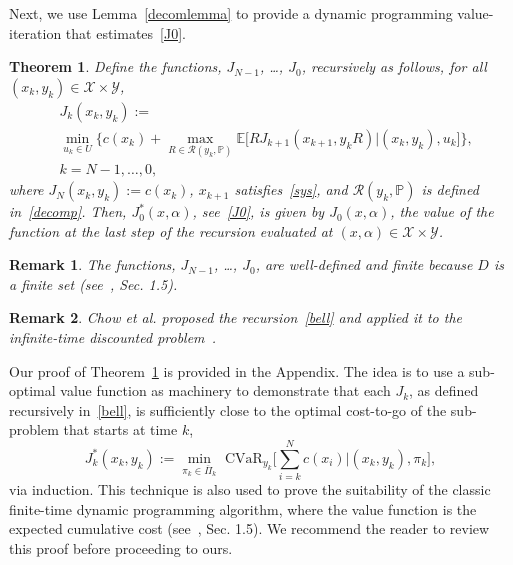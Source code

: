 \documentclass[letterpaper, 10 pt, conference]{ieeeconf}  %
\newtheorem{theorem}{Theorem}
\newtheorem{remark}{Remark}
\begin{document}
Next, we use Lemma~\ref{decomlemma} to provide a dynamic programming value-iteration that estimates~\eqref{J0}.
\begin{theorem}\label{thm}
Define the functions, $J_{N-1}$, \dots, $J_0$, recursively as follows, for all $(x_k, y_k) \in \mathcal{X} \times \mathcal{Y}$,
\begin{equation}\begin{aligned}
& J_k(x_k,y_k) := \\
& {\underset{u_k \in U}\min} \Bigg\{ c(x_k) + {\underset{R \in \mathcal{R}(y_k, \mathbb{P})}\max} \mathbb{E}\Big[ R J_{k+1}(x_{k+1}, y_k R) \Big| (x_k, y_k), u_k \Big] \Bigg\}, \\
& k = N-1, \dots, 0,
\end{aligned}\label{bell}\end{equation}
where $J_N(x_k, y_k) := c(x_k)$, $x_{k+1}$ satisfies~\eqref{sys}, and $\mathcal{R}(y_k, \mathbb{P})$ is defined in~\eqref{decomp}.  
Then, $J_0^*(x,\alpha)$, see~\eqref{J0}, is given by $J_0(x, \alpha)$, 
the value of the function at the last step of the recursion evaluated at $(x,\alpha) \in \mathcal{X} \times \mathcal{Y}$.
\end{theorem}
\begin{remark}
The functions, $J_{N-1}$, \dots, $J_0$, are well-defined and finite because $D$ is a finite set (see~\cite{bertsekas2005dynamic}, Sec. 1.5).
\end{remark}
\begin{remark}
Chow et al. proposed the recursion~\eqref{bell} and applied it to the infinite-time discounted problem~\cite{chow2015risk}. 
\end{remark}

Our proof of Theorem~\ref{thm} is provided in the Appendix.
The idea is to use a sub-optimal value function as machinery to demonstrate that each $J_k$, as defined recursively in~\eqref{bell},
is sufficiently close to the optimal cost-to-go of the sub-problem that starts at time $k$,
\begin{equation}
J_k^*(x_k, y_k) := {\underset{\pi_k \in \bar{\Pi}_k}\min} \text{ CVaR}_{y_k} \Big[ \textstyle\sum_{i=k}^N c(x_i) \Big| (x_k, y_k), \pi_k \Big],
\end{equation}
via induction. This technique is also used to prove the suitability of the classic finite-time dynamic programming algorithm, 
where the value function is the expected cumulative cost (see~\cite{bertsekas2005dynamic}, Sec. 1.5).
We recommend the reader to review this proof before proceeding to ours. 
\end{document}
